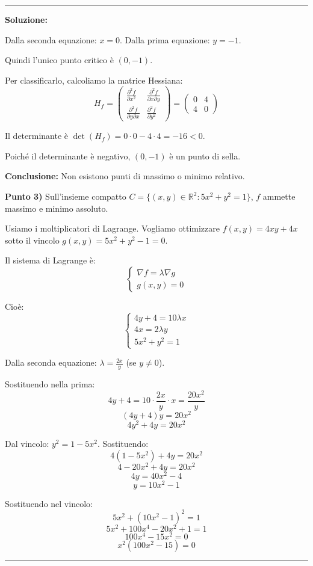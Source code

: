 \documentclass[12pt, a4paper]{article}
\newenvironment{solution}
{\par\noindent\rule{\textwidth}{0.4pt}\par\textbf{Soluzione:}\medskip\par}
{\par\rule{\textwidth}{0.4pt}\par\bigskip}
\begin{document}
\begin{solution}
Dalla seconda equazione: $x = 0$.
Dalla prima equazione: $y = -1$.

Quindi l'unico punto critico è $(0, -1)$.

Per classificarlo, calcoliamo la matrice Hessiana:
\[
H_f = \begin{pmatrix}
\frac{\partial^2 f}{\partial x^2} & \frac{\partial^2 f}{\partial x \partial y} \\
\frac{\partial^2 f}{\partial y \partial x} & \frac{\partial^2 f}{\partial y^2}
\end{pmatrix} = \begin{pmatrix}
0 & 4 \\
4 & 0
\end{pmatrix}
\]

Il determinante è $\det(H_f) = 0 \cdot 0 - 4 \cdot 4 = -16 < 0$.

Poiché il determinante è negativo, $(0, -1)$ è un punto di sella.

\textbf{Conclusione:} Non esistono punti di massimo o minimo relativo.

\vspace{0.5cm}

\textbf{Punto 3)} Sull'insieme compatto $C = \{(x,y) \in \mathbb{R}^2 : 5x^2 + y^2 = 1\}$, $f$ ammette massimo e minimo assoluto.

Usiamo i moltiplicatori di Lagrange. Vogliamo ottimizzare $f(x,y) = 4xy + 4x$ sotto il vincolo $g(x,y) = 5x^2 + y^2 - 1 = 0$.

Il sistema di Lagrange è:
\[
\begin{cases}
\nabla f = \lambda \nabla g \\
g(x,y) = 0
\end{cases}
\]

Cioè:
\[
\begin{cases}
4y + 4 = 10\lambda x \\
4x = 2\lambda y \\
5x^2 + y^2 = 1
\end{cases}
\]

Dalla seconda equazione: $\lambda = \frac{2x}{y}$ (se $y \neq 0$).

Sostituendo nella prima:
\[
4y + 4 = 10 \cdot \frac{2x}{y} \cdot x = \frac{20x^2}{y}
\]
\[
(4y + 4)y = 20x^2
\]
\[
4y^2 + 4y = 20x^2
\]

Dal vincolo: $y^2 = 1 - 5x^2$. Sostituendo:
\[
4(1 - 5x^2) + 4y = 20x^2
\]
\[
4 - 20x^2 + 4y = 20x^2
\]
\[
4y = 40x^2 - 4
\]
\[
y = 10x^2 - 1
\]

Sostituendo nel vincolo:
\[
5x^2 + (10x^2 - 1)^2 = 1
\]
\[
5x^2 + 100x^4 - 20x^2 + 1 = 1
\]
\[
100x^4 - 15x^2 = 0
\]
\[
x^2(100x^2 - 15) = 0
\]


\end{solution}
\end{document}
